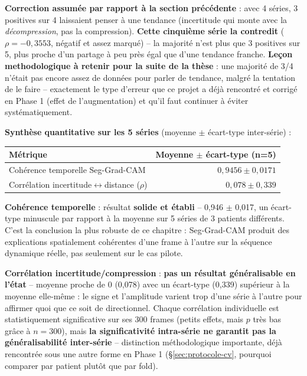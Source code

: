 \documentclass[11pt,a4paper]{report}
\begin{document}
\textbf{Correction assumée par rapport à la section précédente} : avec 4 séries, 3
positives sur 4 laissaient penser à une tendance (incertitude qui monte avec la
\emph{décompression}, pas la compression). \textbf{Cette cinquième série la
contredit} ($\rho=-0{,}3553$, négatif et assez marqué) -- la majorité n'est plus que
3 positives sur 5, plus proche d'un partage à peu près égal que d'une tendance
franche. \textbf{Leçon methodologique à retenir pour la suite de la thèse} : une
majorité de 3/4 n'était pas encore assez de données pour parler de tendance, malgré
la tentation de le faire -- exactement le type d'erreur que ce projet a déjà
rencontré et corrigé en Phase 1 (effet de l'augmentation) et qu'il faut continuer à
éviter systématiquement.

\textbf{Synthèse quantitative sur les 5 séries} (moyenne $\pm$ écart-type
inter-série) :

\begin{center}
\begin{tabular}{lr}
\toprule
Métrique & Moyenne $\pm$ écart-type (n=5) \\
\midrule
Cohérence temporelle Seg-Grad-CAM & $0{,}9456 \pm 0{,}0171$ \\
Corrélation incertitude$\leftrightarrow$distance ($\rho$) & $0{,}078 \pm 0{,}339$ \\
\bottomrule
\end{tabular}
\end{center}

\textbf{Cohérence temporelle} : résultat \textbf{solide et établi} -- 0,946
$\pm$ 0,017, un écart-type minuscule par rapport à la moyenne sur 5 séries de 3
patients différents. C'est la conclusion la plus robuste de ce chapitre : Seg-Grad-CAM
produit des explications spatialement cohérentes d'une frame à l'autre sur la
séquence dynamique réelle, pas seulement sur le cas pilote.

\textbf{Corrélation incertitude/compression} : \textbf{pas un résultat
généralisable en l'état} -- moyenne proche de 0 (0,078) avec un écart-type
(0,339) supérieur à la moyenne elle-même : le signe et l'amplitude varient trop
d'une série à l'autre pour affirmer quoi que ce soit de directionnel. Chaque
corrélation individuelle est statistiquement significative sur ses 300 frames
(petits effets, mais $p$ très bas grâce à $n=300$), mais \textbf{la significativité
intra-série ne garantit pas la généralisabilité inter-série} -- distinction
méthodologique importante, déjà rencontrée sous une autre forme en Phase 1
(\S\ref{sec:protocole-cv}, pourquoi comparer par patient plutôt que par fold).
\end{document}
